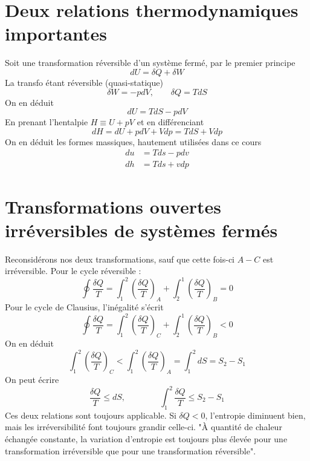 		\newpage
		
	\section{Deux relations thermodynamiques importantes}
	Soit une transformation réversible d'un système fermé, par le premier principe 
	\begin{equation}
	dU = \delta Q + \delta W
	\end{equation}
	La transfo étant réversible (quasi-statique)
	\begin{equation}
	\delta W = -pdV,\qquad \delta Q = TdS
	\end{equation}
	On en déduit
	\begin{equation}
	dU = TdS - pdV
	\end{equation}
	En prenant l'hentalpie $H \equiv U + pV$ et en différenciant 
	\begin{equation}
	dH = dU + pdV + Vdp = TdS + Vdp
	\end{equation}
	On en déduit les formes massiques, hautement utilisées dans ce cours
	\begin{equation}
	\begin{array}{ll}
	du &= Tds- pdv\\
	dh &= Tds + vdp
	\end{array}
	\end{equation}
	
	\section{Transformations ouvertes irréversibles de systèmes fermés}
	Reconsidérons nos deux transformations, sauf que cette fois-ci $A-C$ est 
	irréversible. Pour le cycle réversible :
	\begin{equation}
	\oint \dfrac{\delta Q}{T} = \int_1^2 \left(\dfrac{\delta Q}{T}\right)_A + 
	\int_2^1 \left(\dfrac{\delta Q}{T}\right)_B = 0
	\end{equation}
	Pour le cycle de Clausius, l'inégalité s'écrit
	\begin{equation}
		\oint \dfrac{\delta Q}{T} = \int_1^2 \left(\dfrac{\delta Q}{T}\right)_C + 
	\int_2^1 \left(\dfrac{\delta Q}{T}\right)_B < 0
	\end{equation}
	On en déduit
	\begin{equation}
	\int_1^2\left(\dfrac{\delta Q}{T}\right)_C < \int_1^2 \left(\dfrac{\delta Q}{T}
	\right)_A = \int_1^2 dS = S_2-S_1
	\end{equation}
	On peut écrire
	\begin{equation}
	\dfrac{\delta Q}{T} \leq dS,\qquad\qquad \int_1^2 \dfrac{\delta Q}{T} \leq 
	S_2-S_1
	\end{equation}
	Ces deux relations sont toujours applicable. Si $\delta Q <0$, l'entropie 
	diminuent bien, mais les irréversibilité font toujours grandir celle-ci. 
	"À quantité de chaleur échangée constante, la variation d’entropie est 
	toujours plus élevée pour une transformation irréversible que pour une 
	transformation réversible".
	
